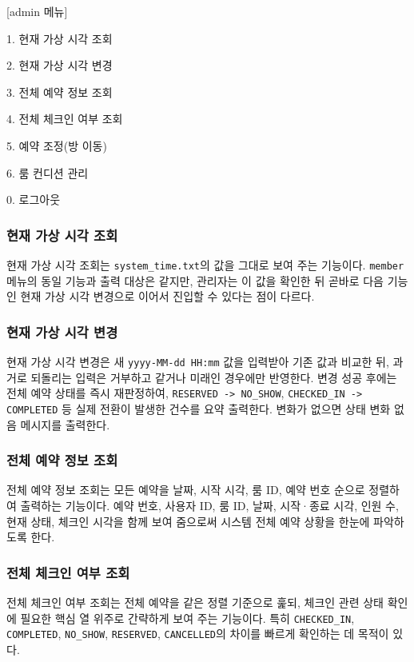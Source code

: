 \documentclass[a4paper,10pt]{article}
\begin{document}
\begin{menubox}
\small
[admin 메뉴]\par
1. 현재 가상 시각 조회\par
2. 현재 가상 시각 변경\par
3. 전체 예약 정보 조회\par
4. 전체 체크인 여부 조회\par
5. 예약 조정(방 이동)\par
6. 룸 컨디션 관리\par
0. 로그아웃
\end{menubox}

\subsubsection{현재 가상 시각 조회}
현재 가상 시각 조회는 \texttt{system\_time.txt}의 값을 그대로 보여 주는 기능이다. \texttt{member} 메뉴의 동일 기능과 출력 대상은 같지만, 관리자는 이 값을 확인한 뒤 곧바로 다음 기능인 현재 가상 시각 변경으로 이어서 진입할 수 있다는 점이 다르다.

\subsubsection{현재 가상 시각 변경}
현재 가상 시각 변경은 새 \texttt{yyyy-MM-dd HH:mm} 값을 입력받아 기존 값과 비교한 뒤, 과거로 되돌리는 입력은 거부하고 같거나 미래인 경우에만 반영한다. 변경 성공 후에는 전체 예약 상태를 즉시 재판정하여, \texttt{RESERVED -> NO\_SHOW}, \texttt{CHECKED\_IN -> COMPLETED} 등 실제 전환이 발생한 건수를 요약 출력한다. 변화가 없으면 상태 변화 없음 메시지를 출력한다.

\subsubsection{전체 예약 정보 조회}
전체 예약 정보 조회는 모든 예약을 날짜, 시작 시각, 룸 ID, 예약 번호 순으로 정렬하여 출력하는 기능이다. 예약 번호, 사용자 ID, 룸 ID, 날짜, 시작·종료 시각, 인원 수, 현재 상태, 체크인 시각을 함께 보여 줌으로써 시스템 전체 예약 상황을 한눈에 파악하도록 한다.

\subsubsection{전체 체크인 여부 조회}
전체 체크인 여부 조회는 전체 예약을 같은 정렬 기준으로 훑되, 체크인 관련 상태 확인에 필요한 핵심 열 위주로 간략하게 보여 주는 기능이다. 특히 \texttt{CHECKED\_IN}, \texttt{COMPLETED}, \texttt{NO\_SHOW}, \texttt{RESERVED}, \texttt{CANCELLED}의 차이를 빠르게 확인하는 데 목적이 있다.
\end{document}
